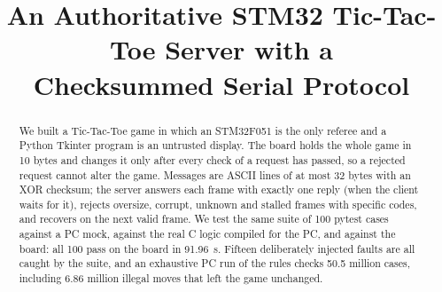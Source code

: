 \documentclass[conference]{IEEEtran}
\newcommand{\code}[1]{\texttt{\detokenize{#1}}}
\begin{document}
\title{An Authoritative STM32 Tic-Tac-Toe Server with a\\
Checksummed Serial Protocol}

\author{
}

\maketitle

\begin{abstract}
We built a Tic-Tac-Toe game in which an STM32F051 is the only referee and a Python
Tkinter program is an untrusted display. The board holds the whole game in 10 bytes and
changes it only after every check of a request has passed, so a rejected request cannot
alter the game. Messages are ASCII lines of at most 32 bytes with an XOR checksum; the
server answers each frame with exactly one reply (when the client waits for it), rejects oversize, corrupt, unknown and
stalled frames with specific \code{NACK} codes, and recovers on the next valid frame. We test
the same suite of 100 pytest cases against a PC mock, against the real C logic compiled for
the PC, and against the board: all 100 pass on the board in 91.96~s. Fifteen deliberately
injected faults are all caught by the suite, and an exhaustive PC run of the rules checks
50.5 million cases, including 6.86 million illegal moves that left the game unchanged.
\end{abstract}















\end{document}

